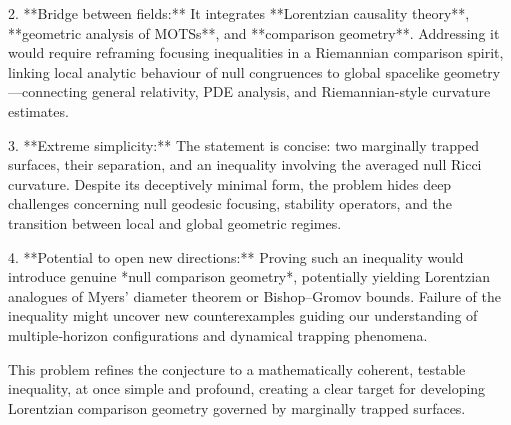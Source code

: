 2. **Bridge between fields:**  
It integrates **Lorentzian causality theory**, **geometric analysis of MOTSs**, and **comparison geometry**.  Addressing it would require reframing focusing inequalities in a Riemannian comparison spirit, linking local analytic behaviour of null congruences to global spacelike geometry—connecting general relativity, PDE analysis, and Riemannian-style curvature estimates.

3. **Extreme simplicity:**  
The statement is concise: two marginally trapped surfaces, their separation, and an inequality involving the averaged null Ricci curvature.  Despite its deceptively minimal form, the problem hides deep challenges concerning null geodesic focusing, stability operators, and the transition between local and global geometric regimes.

4. **Potential to open new directions:**  
Proving such an inequality would introduce genuine *null comparison geometry*, potentially yielding Lorentzian analogues of Myers’ diameter theorem or Bishop–Gromov bounds.  Failure of the inequality might uncover new counterexamples guiding our understanding of multiple‑horizon configurations and dynamical trapping phenomena.

This problem refines the conjecture to a mathematically coherent, testable inequality, at once simple and profound, creating a clear target for developing Lorentzian comparison geometry governed by marginally trapped surfaces.